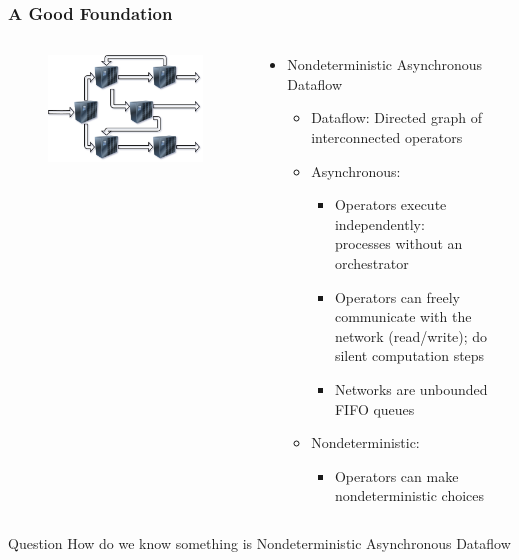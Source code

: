 \documentclass[fleqn,aspectratio=169,10pt]{beamer}
\begin{document}
\begin{frame}[fragile]
  \frametitle{A Good Foundation}
  \begin{columns}
    \begin{column}{.35\textwidth}
      \begin{figure}
        \centering
        \includegraphics[width=1\textwidth]{network.png}
      \end{figure}
    \end{column}
    \begin{column}{.65\textwidth}
      \begin{itemize}
        \item Nondeterministic Asynchronous Dataflow
              \begin{itemize}
                \pause
                \item Dataflow: Directed graph of interconnected operators
                \pause
                \item Asynchronous:
                      \begin{itemize}
                        \item Operators execute independently:\\ processes without an orchestrator
                        \item Operators can freely communicate with the network (read/write); do silent computation steps
                        \item Networks are unbounded FIFO queues
                      \end{itemize}
                \pause
                \item Nondeterministic:
                      \begin{itemize}
                        \item Operators can make nondeterministic choices
                      \end{itemize}
              \end{itemize}
      \end{itemize}
    \end{column}
  \end{columns}
  \begin{block}{Question}
    How do we know something is Nondeterministic Asynchronous Dataflow
  \end{block}
\end{frame}
\end{document}
